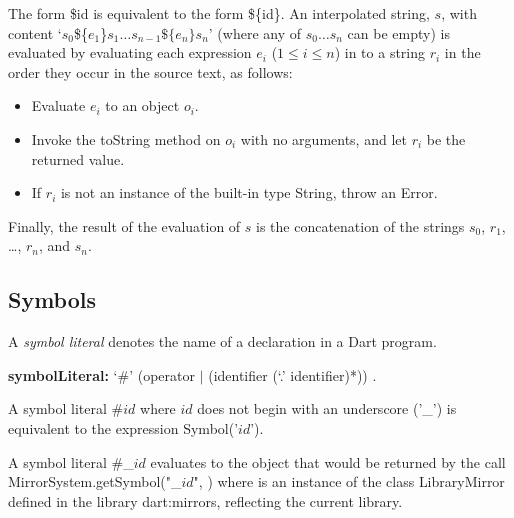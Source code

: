 \documentclass{article}
\newcommand{\code}[1]{{\sf #1}}
\begin{document}
\LMHash{}
The form \code{\$id} is equivalent to the form \code{\$\{id\}}.
An interpolated string, $s$, with content `\code{$s_0$\$\{$e_1$\}$s_1\ldots{}s_{n-1}\$\{e_n\}s_{n}$}' (where any of $s_0 \ldots{} s_n$ can be empty)
is evaluated by evaluating each expression $e_i$ ($1 \le i \le n$) in to a string $r_i$ in the order they occur in the source text, as follows:
\begin{itemize}
\item{} Evaluate $e_i$ to an object $o_i$.
\item{} Invoke the \code{toString} method on $o_i$ with no arguments, and let
  $r_i$ be the returned value.
\item{} If $r_i$ is not an instance of the built-in type \code{String}, throw an \code{Error}.
\end{itemize}
Finally, the result of the evaluation of $s$ is the concatenation of the strings $s_0$, $r_1$, \ldots{}, $r_n$, and $s_n$.

\subsection{Symbols}

\LMHash{}
A {\em symbol literal} denotes the name of a declaration in a Dart program.

\begin{grammar}
{\bf symbolLiteral:}
      `\#'  (operator $|$ (identifier (`{\escapegrammar .}' identifier)*))  .
\end{grammar}

\LMHash{}
A symbol literal \code{\#$id$} where $id$ does not begin with an underscore ('\code{\_}')  is equivalent to the expression \code{\CONST{} Symbol('$id$')}.

\LMHash{}
A symbol literal \code{\#\_$id$} evaluates to the object that would be returned by the call \code{MirrorSystem.getSymbol("\_$id$", )} where  is an instance of the class \code{LibraryMirror} defined in the library \code{dart:mirrors}, reflecting the current library.
\end{document}
